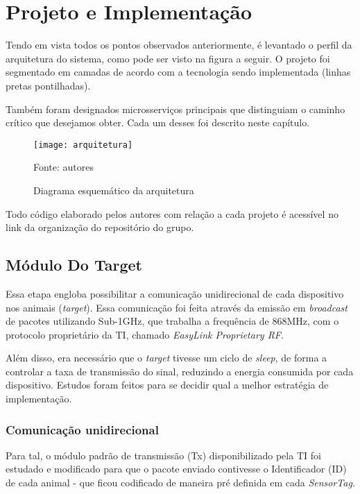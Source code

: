 \chapter{Projeto e Implementação}

Tendo em vista todos os pontos observados anteriormente, é levantado o perfil da arquitetura do sistema, como pode ser visto na figura a seguir. O projeto foi segmentado em camadas de acordo com a tecnologia sendo implementada (linhas pretas pontilhadas).

Também foram designados microsserviços principais que distinguiam o caminho crítico que desejamos obter. Cada um desses foi descrito neste capítulo.

\begin{figure}[ht]
  \centering
    \caption{Diagrama esquemático da arquitetura}
    \texttt{[image: arquitetura]}
  \centerline{\small{Fonte: autores}}
\end{figure}
\FloatBarrier

Todo código elaborado pelos autores com relação a cada projeto é acessível no link da organização do repositório do grupo\cite{github}.

\section{Módulo Do Target}

Essa etapa engloba possibilitar a comunicação unidirecional de cada dispositivo nos animais (\emph{target}). Essa comunicação foi feita através da emissão em \emph{broadcast} de pacotes utilizando Sub-1GHz, que trabalha a frequência de 868MHz, com o protocolo proprietário da TI, chamado \emph{EasyLink Proprietary RF}.

Além disso, era necessário que o \emph{target} tivesse um ciclo de \emph{sleep}, de forma a controlar a taxa de transmissão do sinal, reduzindo a energia consumida por cada dispositivo. Estudos foram feitos para se decidir qual a melhor estratégia de implementação.

\subsection{Comunicação unidirecional}

Para tal, o módulo padrão de transmissão (Tx) disponibilizado pela TI foi estudado e modificado para que o pacote enviado contivesse o Identificador (ID) de cada animal - que ficou codificado de maneira pré definida em cada \emph{SensorTag}.

